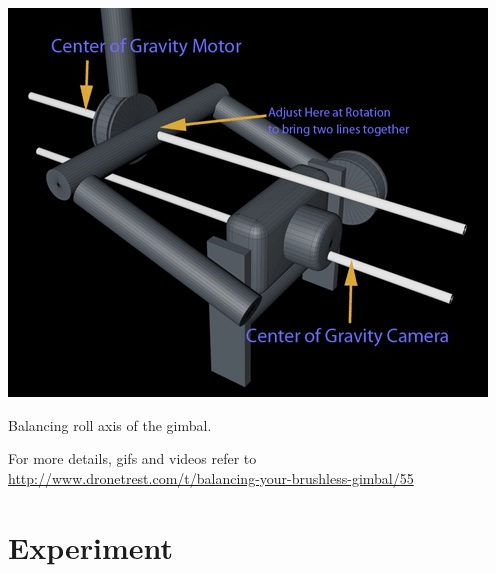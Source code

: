 \documentclass[11pt,a4paper]{article}
\begin{document}
		\begin{center}
			\includegraphics[scale=0.7]{balancing_roll_2.jpg}
		\end{center}
		\begin{center}
			Balancing roll axis of the gimbal.
		\end{center}
		For more details, gifs and videos refer to
		\newline
		\url{http://www.dronetrest.com/t/balancing-your-brushless-gimbal/55}
			
	\section{Experiment}
\end{document}
